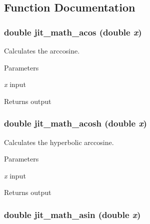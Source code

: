 \subsection{Function Documentation}
\hypertarget{group__mathmod_ga965c3e237069987a81743e38f66c587f}{
\subsubsection[{jit\_\-math\_\-acos}]{\setlength{\rightskip}{0pt plus 5cm}double jit\_\-math\_\-acos (double {\em x})}}
\label{group__mathmod_ga965c3e237069987a81743e38f66c587f}


Calculates the arccosine. 
\begin{DoxyParams}{Parameters}
\item[{\em x}]input \end{DoxyParams}
\begin{DoxyReturn}{Returns}
output 
\end{DoxyReturn}
\hypertarget{group__mathmod_ga41dfbcb172c26b6698188c1ae277fbcc}{
\subsubsection[{jit\_\-math\_\-acosh}]{\setlength{\rightskip}{0pt plus 5cm}double jit\_\-math\_\-acosh (double {\em x})}}
\label{group__mathmod_ga41dfbcb172c26b6698188c1ae277fbcc}


Calculates the hyperbolic arccosine. 
\begin{DoxyParams}{Parameters}
\item[{\em x}]input \end{DoxyParams}
\begin{DoxyReturn}{Returns}
output 
\end{DoxyReturn}
\hypertarget{group__mathmod_ga2b5f79c1638e9d10bd1cbfd1295db9b9}{
\subsubsection[{jit\_\-math\_\-asin}]{\setlength{\rightskip}{0pt plus 5cm}double jit\_\-math\_\-asin (double {\em x})}}
\label{group__mathmod_ga2b5f79c1638e9d10bd1cbfd1295db9b9}


